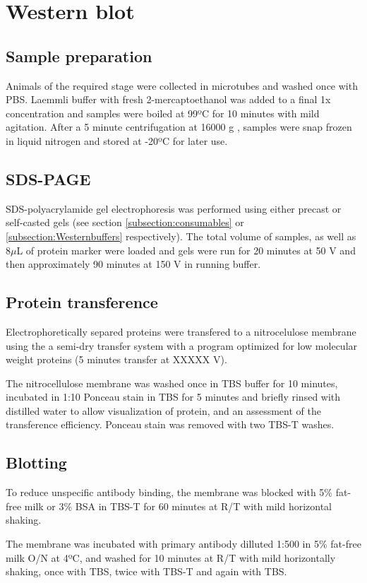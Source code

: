 \documentclass[11pt,twoside,a4paper]{report}
\begin{document}
	\section{Western blot}
			\subsection{Sample preparation}
			Animals of the required stage were collected in microtubes and washed once with PBS. Laemmli buffer with fresh 2-mercaptoethanol was added to a final 1x concentration and samples were boiled at 99ºC for 10 minutes with mild agitation. After a 5 minute centrifugation at 16000 g , samples were snap frozen in liquid nitrogen and stored at -20ºC for later use.
			
			\subsection{SDS-PAGE}
			SDS-polyacrylamide gel electrophoresis was performed using either precast or self-casted gels (see section \ref{subsection:consumables} or \ref{subsection:Westernbuffers} respectively). The total volume of samples, as well as 8$\mu$L of protein marker were loaded and gels were run for 20 minutes at 50 V and then approximately 90 minutes at 150 V in running buffer.
			
			\subsection{Protein transference}
			Electrophoretically separed proteins were transfered to a nitrocelulose membrane using the a semi-dry transfer system with a program optimized for low molecular weight proteins (5 minutes transfer at XXXXX V).
			
			The nitrocellulose membrane was washed once in TBS buffer for 10 minutes, incubated in 1:10 Ponceau stain in TBS for 5 minutes and briefly rinsed with distilled water to allow visualization of protein, and an assessment of the transference efficiency. Ponceau stain was removed with two TBS-T washes.
			\subsection{Blotting}
			To reduce unspecific antibody binding, the membrane was blocked with 5\% fat-free milk or 3\% BSA in TBS-T for 60 minutes at R/T with mild horizontal shaking.
			
			The membrane was incubated with primary antibody dilluted 1:500 in 5\% fat-free milk O/N at 4ºC, and washed for 10 minutes at R/T with mild horizontally shaking, once with TBS, twice with TBS-T and again with TBS.
			
\end{document}
